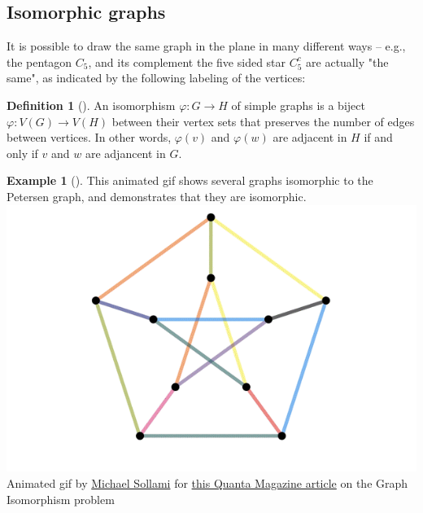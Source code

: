 \documentclass[10pt,]{book}
\theoremstyle{plain}
\theoremstyle{definition}
\newtheorem{definition}[theorem]{Definition}
\theoremstyle{definition}
\theoremstyle{definition}
\newtheorem{example}[theorem]{Example}
\theoremstyle{definition}
\numberwithin{equation}{section}
\begin{document}
\subsection[{Isomorphic graphs}]{Isomorphic graphs}\label{subsection-7}
\hypertarget{p-39}{}%
It is possible to draw the same graph in the plane in many different ways – e.g., the pentagon \(C_5\), and its complement the five sided star \(C_5^c\) are actually "the same", as indicated by the following labeling of the vertices:%
\begin{definition}[{}]\label{definition-9}
\hypertarget{p-40}{}%
An isomorphism \(\varphi:G\to H\) of simple graphs is a biject \(\varphi:V(G)\to V(H)\) between their vertex sets that preserves the number of edges between vertices.  In other words, \(\varphi(v)\) and \(\varphi(w)\) are adjacent in \(H\) if and only if \(v\) and \(w\) are adjancent in \(G\).%
\end{definition}
\begin{example}[]\label{example-7}
\hypertarget{p-41}{}%
This animated gif shows several graphs isomorphic to the Petersen graph, and demonstrates that they are isomorphic.%
\includegraphics[width=1\linewidth]{images/PetersenIsomorphismAnimated.gif}
\hypertarget{p-42}{}%
Animated gif by \href{https://msollami.com/code/2014/12/24/graph-isomorphisms}{Michael Sollami} for \href{https://www.quantamagazine.org/algorithm-solves-graph-isomorphism-in-record-time-20151214/}{this Quanta Magazine article} on the Graph Isomorphism problem%
\end{example}
\end{document}
